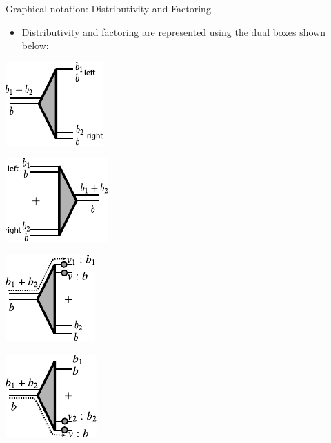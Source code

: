 \documentclass[11pt]{beamer}
\begin{document}
\begin{frame}{Graphical notation: Distributivity and Factoring} 

\begin{itemize}
\item   Distributivity and factoring are represented using the dual boxes shown
  below:
\end{itemize}

\begin{multicols}{2}
\begin{center}
  \includegraphics{diagrams/thesis/dist.pdf}
\end{center}
\begin{center}
  \includegraphics{diagrams/thesis/factor.pdf}
\end{center}
\end{multicols}

\vfill

\begin{multicols}{2}
\begin{center}
  \includegraphics{diagrams/thesis/dist-wire-value1.pdf}
\end{center}
\begin{center}
  \includegraphics{diagrams/thesis/dist-wire-value2.pdf}
\end{center}
\end{multicols}

\end{frame}
\end{document}
